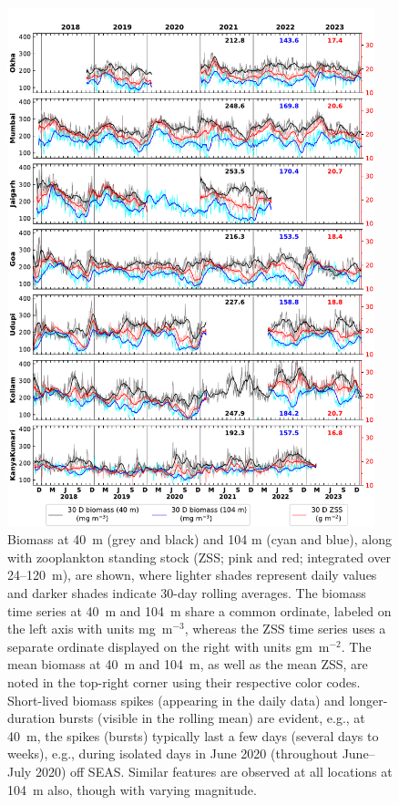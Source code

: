 \documentclass[authoryear,review,11pt]{elsarticle}
\begin{document}
\begin{figure}[htbp]
	\centering
	\includegraphics[width=0.95\textwidth]{./fig_04_ss_biomass_40m_104m.pdf} 
	\captionsetup{justification=justified,font=footnotesize,skip=0.05\baselineskip,width=\textwidth}
	\caption{Biomass at 40~m (grey and black) and 104 m (cyan and blue), along with zooplankton standing stock (ZSS; pink and red; integrated over 24--120~m), are shown, where lighter shades represent daily values and darker shades indicate 30-day rolling averages. The biomass time series at 40~m and 104~m share a common ordinate, labeled on the left axis with units mg~m$^{-3}$, whereas the ZSS time series uses a separate ordinate displayed on the right with units gm~m$^{-2}$. The mean biomass at 40~m and 104~m, as well as the mean ZSS, are noted in the top-right corner using their respective color codes. Short-lived biomass spikes (appearing in the daily data) and longer-duration bursts (visible in the rolling mean) are evident, e.g., at 40~m, the spikes (bursts) typically last a few days (several days to weeks), e.g., during isolated days in June 2020 (throughout June--July 2020) off SEAS. Similar features are observed at all locations at 104~m also, though with varying magnitude.}
	\label{fig:ss_biomass_40m_104m}
\end{figure}
\end{document}
